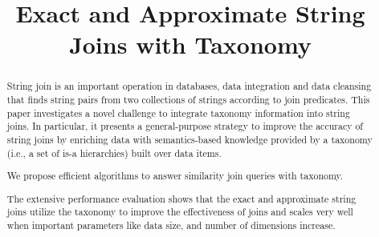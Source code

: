 \documentclass{sig-alternate}
\newcommand{\topkm}{\mbox{top-$k$,$m$}}
\begin{document}


\title{Exact and Approximate String Joins with Taxonomy}


\author{
}




\maketitle

\begin{abstract}

String join is an important operation in databases, data integration
and data cleansing that finds string pairs from
two collections of strings according to join predicates. This paper investigates a novel challenge to integrate taxonomy information into string joins. In particular, it presents a general-purpose strategy to improve the accuracy of string joins by enriching data with semantics-based knowledge provided by a
taxonomy (i.e., a set of is-a hierarchies) built over data items. 


We propose efficient algorithms to answer similarity join queries with taxonomy.

The extensive performance evaluation shows that the exact and approximate string joins utilize the taxonomy to improve the effectiveness of joins  and scales very well when important parameters like  data size, and number of dimensions increase.


\end{abstract}
\end{document}
